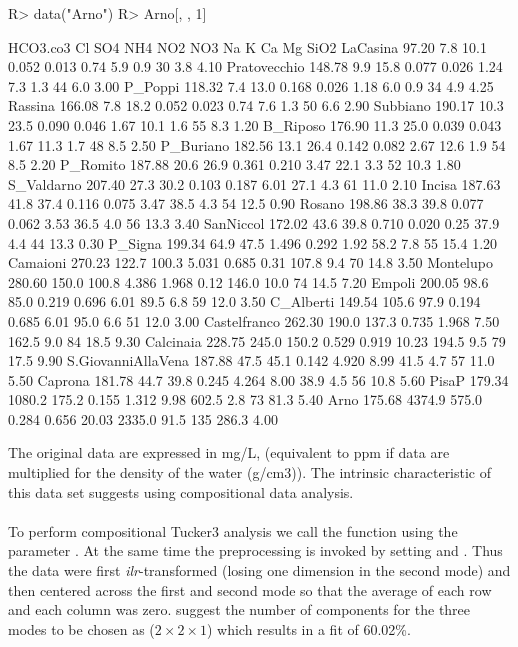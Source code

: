 \documentclass[article,shortnames, nojss]{jss}
\begin{document}
\begin{Schunk}
\begin{Sinput}
R> data("Arno")
R> Arno[, , 1]
\end{Sinput}
\begin{Soutput}
                   HCO3.co3     Cl   SO4   NH4   NO2   NO3     Na    K  Ca    Mg SiO2
LaCasina              97.20    7.8  10.1 0.052 0.013  0.74    5.9  0.9  30   3.8 4.10
Pratovecchio         148.78    9.9  15.8 0.077 0.026  1.24    7.3  1.3  44   6.0 3.00
P_Poppi              118.32    7.4  13.0 0.168 0.026  1.18    6.0  0.9  34   4.9 4.25
Rassina              166.08    7.8  18.2 0.052 0.023  0.74    7.6  1.3  50   6.6 2.90
Subbiano             190.17   10.3  23.5 0.090 0.046  1.67   10.1  1.6  55   8.3 1.20
B_Riposo             176.90   11.3  25.0 0.039 0.043  1.67   11.3  1.7  48   8.5 2.50
P_Buriano            182.56   13.1  26.4 0.142 0.082  2.67   12.6  1.9  54   8.5 2.20
P_Romito             187.88   20.6  26.9 0.361 0.210  3.47   22.1  3.3  52  10.3 1.80
S_Valdarno           207.40   27.3  30.2 0.103 0.187  6.01   27.1  4.3  61  11.0 2.10
Incisa               187.63   41.8  37.4 0.116 0.075  3.47   38.5  4.3  54  12.5 0.90
Rosano               198.86   38.3  39.8 0.077 0.062  3.53   36.5  4.0  56  13.3 3.40
SanNiccol            172.02   43.6  39.8 0.710 0.020  0.25   37.9  4.4  44  13.3 0.30
P_Signa              199.34   64.9  47.5 1.496 0.292  1.92   58.2  7.8  55  15.4 1.20
Camaioni             270.23  122.7 100.3 5.031 0.685  0.31  107.8  9.4  70  14.8 3.50
Montelupo            280.60  150.0 100.8 4.386 1.968  0.12  146.0 10.0  74  14.5 7.20
Empoli               200.05   98.6  85.0 0.219 0.696  6.01   89.5  6.8  59  12.0 3.50
C_Alberti            149.54  105.6  97.9 0.194 0.685  6.01   95.0  6.6  51  12.0 3.00
Castelfranco         262.30  190.0 137.3 0.735 1.968  7.50  162.5  9.0  84  18.5 9.30
Calcinaia            228.75  245.0 150.2 0.529 0.919 10.23  194.5  9.5  79  17.5 9.90
S.GiovanniAllaVena   187.88   47.5  45.1 0.142 4.920  8.99   41.5  4.7  57  11.0 5.50
Caprona              181.78   44.7  39.8 0.245 4.264  8.00   38.9  4.5  56  10.8 5.60
PisaP                179.34 1080.2 175.2 0.155 1.312  9.98  602.5  2.8  73  81.3 5.40
Arno                 175.68 4374.9 575.0 0.284 0.656 20.03 2335.0 91.5 135 286.3 4.00
\end{Soutput}
\end{Schunk}
\normalsize
The original data are expressed in mg/L, (equivalent to ppm if data are multiplied
for the density of the water (g/cm3)). The intrinsic characteristic of this data set
suggests using compositional data analysis.\\\\
To perform compositional Tucker3 analysis we call the function
 using the parameter .
At the same time the preprocessing is invoked by setting 
and .
Thus the data were first \emph{ilr}-transformed (losing one dimension in
the second mode) and then centered across the first and second mode so that
the average of each row and each column was zero.
\cite{gallo-buccianti:2013} suggest the number of components for the three modes to be chosen as
($2 \times 2 \times 1$) which results in a fit of 60.02\%.
\end{document}
